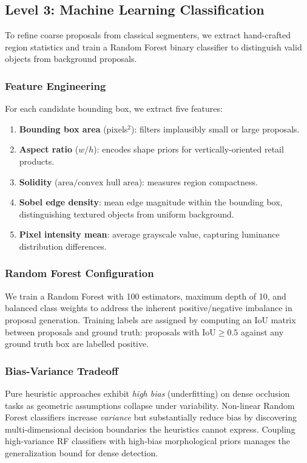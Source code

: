 \documentclass[conference]{IEEEtran}
\begin{document}
\subsection{Level 3: Machine Learning Classification}
\label{sec:ml_model}

To refine coarse proposals from classical segmenters, we extract
hand-crafted region statistics and train a Random Forest binary
classifier to distinguish valid objects from background proposals.

\subsubsection{Feature Engineering}
For each candidate bounding box, we extract five features:
\begin{enumerate}
  \item \textbf{Bounding box area} (pixels$^2$): filters implausibly
    small or large proposals.
  \item \textbf{Aspect ratio} ($w/h$): encodes shape priors for
    vertically-oriented retail products.
  \item \textbf{Solidity} ($\text{area}/\text{convex hull area}$):
    measures region compactness.
  \item \textbf{Sobel edge density}: mean edge magnitude within the
    bounding box, distinguishing textured objects from uniform background.
  \item \textbf{Pixel intensity mean}: average grayscale value,
    capturing luminance distribution differences.
\end{enumerate}

\subsubsection{Random Forest Configuration}
We train a Random Forest with 100 estimators, maximum depth of 10,
and balanced class weights to address the inherent positive/negative
imbalance in proposal generation. Training labels are assigned by
computing an IoU matrix between proposals and ground truth: proposals
with $\text{IoU} \geq 0.5$ against any ground truth box are labelled
positive.

\subsubsection{Bias-Variance Tradeoff}
Pure heuristic approaches exhibit \textit{high bias} (underfitting) on
dense occlusion tasks as geometric assumptions collapse under variability.
Non-linear Random Forest classifiers increase \textit{variance} but
substantially reduce bias by discovering multi-dimensional decision
boundaries the heuristics cannot express. Coupling high-variance RF
classifiers with high-bias morphological priors manages the
generalization bound for dense detection.
\end{document}
